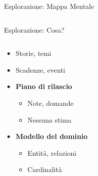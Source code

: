 \documentclass[compress, red, 14pt, pdf]{beamer}
\begin{document}
\begin{frame}{Esplorazione: Mappa Mentale}
\begin{columns}[T]
\begin{column}{.5\textwidth}
		    \end{column}
		 \end{columns}
	\end{frame}

	\begin{frame}{Esplorazione: Cosa?}

		\begin{columns}[T]
		    \begin{column}{0.6\textwidth}

				\begin{itemize}
					\item Storie, temi
					\item Scadenze, eventi
				\end{itemize}

				\begin{itemize}
					\item \textbf{Piano di rilascio}
					\begin{itemize}
						\item Note, domande
						\item Nessuna stima
					\end{itemize}
					\item \textbf{Modello del dominio}
					\begin{itemize}
						\item Entità, relazioni
						\item Cardinalità
					\end{itemize}
				\end{itemize}
				

\end{column}
\end{columns}
\end{frame}
\end{document}
